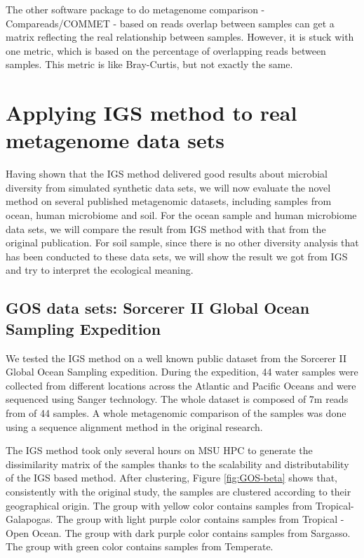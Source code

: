 The other software package to do metagenome comparison - Compareads/COMMET -
based on reads overlap between samples can get a matrix 
reflecting the real relationship between samples. However, it is stuck with one 
metric, which is based on the percentage of overlapping reads between samples. 
This metric is like Bray-Curtis, but not exactly the same.

\section{Applying IGS method to real metagenome data sets}

Having shown that the IGS method delivered good results about microbial diversity 
from simulated synthetic data sets, 
we will now evaluate the novel method on several published metagenomic 
datasets, including samples 
from ocean, human microbiome and soil. For the ocean sample and human microbiome 
data sets, we will compare the result from IGS method
with that from the original publication. For soil sample, since there is no other 
diversity analysis that has been conducted
to these data sets, we will show the result we got from IGS and try to 
interpret the ecological meaning.

\subsection{GOS data sets: Sorcerer II Global Ocean Sampling Expedition}

We tested the IGS method on a well known public dataset from the Sorcerer II 
Global Ocean Sampling expedition.
During the expedition, 44 water samples were collected from different locations across the
Atlantic and Pacific Oceans and were sequenced using Sanger technology. 
The whole dataset is composed of 7m reads from of 44 samples.
A whole metagenomic comparison of the samples was done
using a sequence alignment method in the original research. 

The IGS method took only several hours on MSU HPC to generate the dissimilarity 
matrix of the samples thanks to the scalability and distributability of the IGS 
based method. After clustering, 
Figure \ref{fig:GOS-beta} shows that, consistently with the original study, 
the samples are clustered according to their 
geographical origin. The group with yellow color contains samples from 
Tropical- Galapogas. The group with light purple color
contains samples from Tropical -Open Ocean. The group with dark purple 
color contains samples from Sargasso. The group 
with green color contains samples from Temperate. 

